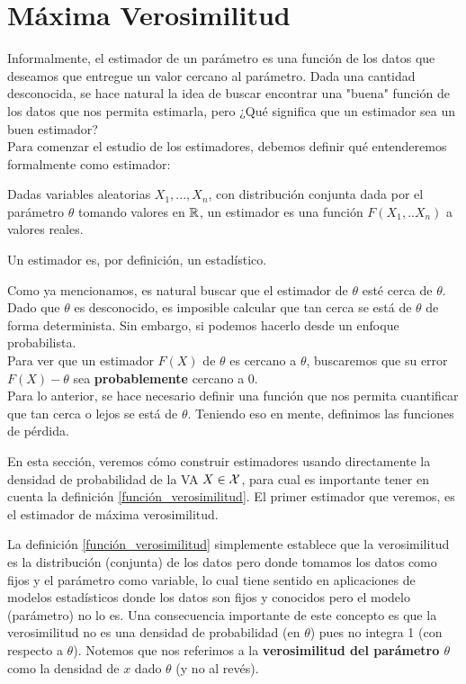 \section{Máxima Verosimilitud} %
\label{sec:estimador_de_máxima_verosimilitud}

Informalmente, el estimador de un parámetro es una función de los datos que deseamos que entregue un valor cercano al parámetro. Dada una cantidad desconocida, se hace natural la idea de buscar encontrar una "buena" función de los datos que nos permita estimarla, pero ¿Qué significa que un estimador sea un buen estimador? \\
Para comenzar el estudio de los estimadores, debemos definir qué entenderemos formalmente como estimador: 
\begin{definition}
Dadas variables aleatorias $X_1,...,X_n$, con distribución conjunta dada por el parámetro $\theta$ tomando valores en ${\mathbb R}$, un estimador es una función $F(X_1,..X_n)$ a valores reales. 
\end{definition}

\begin{remark}
Un estimador es, por definición, un estadístico. 
\end{remark}

Como ya mencionamos, es natural buscar que el estimador de $\theta$ esté cerca de $\theta$. Dado que $\theta$ es desconocido, es imposible calcular que tan cerca se está de $\theta$ de forma determinista. Sin embargo, si podemos hacerlo desde un enfoque probabilista. \\
Para ver que un estimador $F(X)$ de $\theta$ es cercano a $\theta$, buscaremos que su error $F(X)-\theta$ sea \textbf{probablemente} cercano a 0. \\
Para lo anterior, se hace necesario definir una función que nos permita cuantificar que tan cerca o lejos se está de $\theta$. Teniendo eso en mente, definimos las funciones de pérdida.

En esta sección, veremos cómo construir estimadores usando directamente la densidad de probabilidad de la VA $X\in{\mathcal X}$, para cual es importante tener en cuenta la definición \ref{función_verosimilitud}. 
El primer estimador que veremos, es el estimador de máxima verosimilitud.

La definición \ref{función_verosimilitud} simplemente establece que la verosimilitud es la distribución (conjunta) de los datos pero donde tomamos los datos como fijos y el parámetro como variable, lo cual tiene sentido en aplicaciones de modelos estadísticos donde los datos son fijos y conocidos pero el modelo (parámetro)
no lo es. Una consecuencia importante de este concepto es que la verosimilitud no es una densidad de probabilidad (en $\theta$) pues no integra 1 (con respecto a $\theta$). Notemos que nos referimos a la \textbf{verosimilitud del parámetro $\theta$} como la densidad de $x$ dado $\theta$ (y no al revés).

